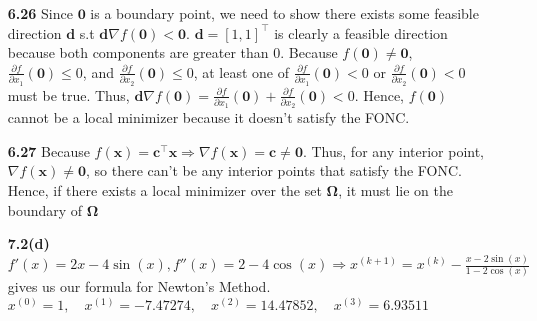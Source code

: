 \documentclass[10pt]{article}
\begin{document}
\begin{enumerate}
    \item [\textbf{6.26}] Since $\mathbf{0}$ is a boundary point, we need to show there exists some feasible direction $\mathbf{d}$ s.t $\mathbf{d}\nabla f(\mathbf{0})<\mathbf{0}$.
    $\mathbf{d}={[1,1]}^{\top}$ is clearly a feasible direction because both components are greater than $0$. 
    Because $f(\mathbf{0})\neq \mathbf{0}$, $\frac{\partial f}{\partial x_1}(\mathbf{0})\le 0$, and $\frac{\partial f}{\partial x_2}(\mathbf{0})\le 0$, at least one of $\frac{\partial f}{\partial x_1}(\mathbf{0})<0$ or $\frac{\partial f}{\partial x_2}(\mathbf{0})<0$ must be true.
    Thus, $\mathbf{d}\nabla f(\mathbf{0})=\frac{\partial f}{\partial x_1}(\mathbf{0})+\frac{\partial f}{\partial x_2}(\mathbf{0})<0$.
    Hence, $f(\mathbf{0})$ cannot be a local minimizer because it doesn't satisfy the FONC.
    \item [\textbf{6.27}] Because $f(\mathbf{x})=\mathbf{c}^\top\mathbf{x}\Rightarrow \nabla f(\mathbf{x})=\mathbf{c}\neq \mathbf{0}$. 
    Thus, for any interior point, $\nabla f(\mathbf{x})\neq \mathbf{0}$, so there can't be any interior points that satisfy the FONC.
    Hence, if there exists a local minimizer over the set $\mathbf{\Omega}$, it must lie on the boundary of $\mathbf{\Omega}$
    \item [\textbf{7.2(d)}] $f'(x)=2x-4\sin(x),f''(x)=2-4\cos(x) \Rightarrow x^{(k+1)}=x^{(k)}-\frac{x-2\sin(x)}{1-2\cos(x)}$ gives us our formula for Newton's Method.\\
    $x^{(0)}=1,\quad x^{(1)}=-7.47274,\quad x^{(2)}=14.47852,\quad x^{(3)}=6.93511$
    
\end{enumerate}
\end{document}
